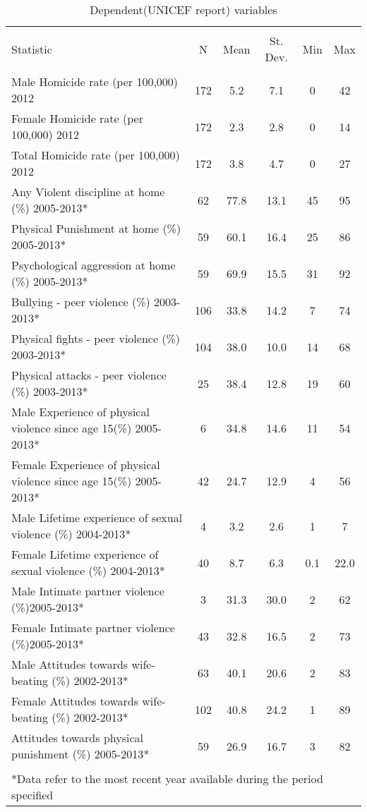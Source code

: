 
\begin{table}[!htbp] \centering 
  \caption{Dependent(UNICEF report) variables} 
  \label{} 
\begin{tabular}{@{\extracolsep{5pt}}lccccc} 
\\[-1.8ex]\hline 
\hline \\[-1.8ex] 
Statistic & \multicolumn{1}{c}{N} & \multicolumn{1}{c}{Mean} & \multicolumn{1}{c}{St. Dev.} & \multicolumn{1}{c}{Min} & \multicolumn{1}{c}{Max} \\ 
\hline \\[-1.8ex] 
Male Homicide rate (per 100,000) 2012 & 172 & 5.2 & 7.1 & 0 & 42 \\ 
Female Homicide rate (per 100,000)  2012 & 172 & 2.3 & 2.8 & 0 & 14 \\ 
Total Homicide rate (per 100,000)  2012 & 172 & 3.8 & 4.7 & 0 & 27 \\ 
Any Violent discipline at home (\%) 2005-2013* & 62 & 77.8 & 13.1 & 45 & 95 \\ 
Physical Punishment at home (\%) 2005-2013* & 59 & 60.1 & 16.4 & 25 & 86 \\ 
Psychological aggression at home (\%) 2005-2013* & 59 & 69.9 & 15.5 & 31 & 92 \\ 
Bullying - peer violence (\%) 2003-2013* & 106 & 33.8 & 14.2 & 7 & 74 \\ 
Physical fights - peer violence (\%) 2003-2013* & 104 & 38.0 & 10.0 & 14 & 68 \\ 
Physical attacks - peer violence (\%) 2003-2013* & 25 & 38.4 & 12.8 & 19 & 60 \\ 
Male Experience of physical violence since age 15(\%) 2005-2013* & 6 & 34.8 & 14.6 & 11 & 54 \\ 
Female Experience of physical violence since age 15(\%) 2005-2013* & 42 & 24.7 & 12.9 & 4 & 56 \\ 
Male Lifetime experience of sexual violence (\%) 2004-2013* & 4 & 3.2 & 2.6 & 1 & 7 \\ 
Female Lifetime experience of sexual violence (\%) 2004-2013* & 40 & 8.7 & 6.3 & 0.1 & 22.0 \\ 
Male Intimate partner violence (\%)2005-2013* & 3 & 31.3 & 30.0 & 2 & 62 \\ 
Female Intimate partner violence (\%)2005-2013* & 43 & 32.8 & 16.5 & 2 & 73 \\ 
Male Attitudes towards wife-beating (\%) 2002-2013* & 63 & 40.1 & 20.6 & 2 & 83 \\ 
Female Attitudes towards wife-beating (\%) 2002-2013* & 102 & 40.8 & 24.2 & 1 & 89 \\ 
Attitudes towards physical punishment (\%) 2005-2013* & 59 & 26.9 & 16.7 & 3 & 82 \\ 
\hline \\[-1.8ex] 
\multicolumn{6}{l}{*Data refer to the most recent year available during the period specified} \\ 
\end{tabular} 
\end{table} 
